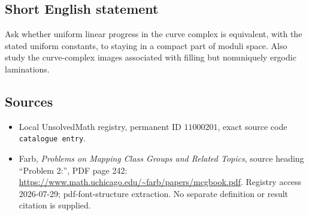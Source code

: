 \documentclass[11pt]{article}
\begin{document}
\subsection{Short English statement}
Ask whether uniform linear progress in the curve complex is equivalent, with the stated uniform constants, to staying in a compact part of moduli space. Also study the curve-complex images associated with filling but nonuniquely ergodic laminations.
\subsection{Sources}
\begin{itemize}
\item Local UnsolvedMath registry, permanent ID \(11000201\), exact source code \texttt{catalogue entry}.
\item Farb, \emph{Problems on Mapping Class Groups and Related Topics}, source heading ``Problem 2:'', PDF page 242: \url{https://www.math.uchicago.edu/~farb/papers/mcgbook.pdf}. Registry access 2026-07-29; pdf-font-structure extraction. No separate definition or result citation is supplied.
\end{itemize}
\end{document}
